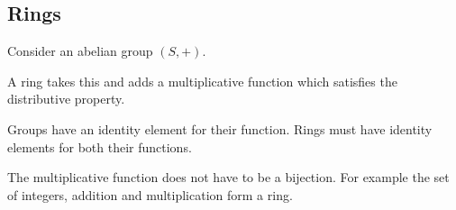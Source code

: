 
\subsection{Rings}

Consider an abelian group \((S,+)\).

A ring takes this and adds a multiplicative function which satisfies the distributive property.

Groups have an identity element for their function. Rings must have identity elements for both their functions.

The multiplicative function does not have to be a bijection. For example the set of integers, addition and multiplication form a ring.

